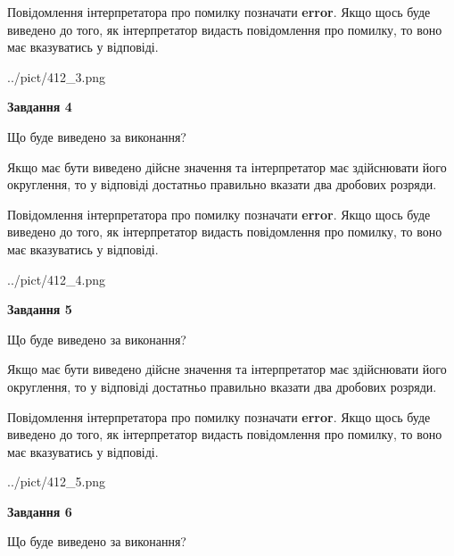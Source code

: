\documentclass[12pt, ukrainian]{article}
\begin{document}
{\begin {Large}
Повідомлення інтерпретатора про помилку позначати \textbf{error}.
Якщо щось буде виведено до того, як інтерпретатор видасть повідомлення про помилку, 
то воно має вказуватись у відповіді. \par

\begin{center}
	{../pict/412_3.png}
\end{center}
\newpage

{\begin {center}\textbf{Завдання 4}\end {center}}\par
Що буде виведено за виконання? \par

Якщо має бути виведено дійсне значення та інтерпретатор має здійснювати його округлення, 
то у відповіді достатньо правильно вказати два дробових розряди.

Повідомлення інтерпретатора про помилку позначати \textbf{error}.
Якщо щось буде виведено до того, як інтерпретатор видасть повідомлення про помилку, 
то воно має вказуватись у відповіді. \par

\begin{center}
	{../pict/412_4.png}
\end{center}
\newpage

{\begin {center}\textbf{Завдання 5}\end {center}}\par
Що буде виведено за виконання? \par

Якщо має бути виведено дійсне значення та інтерпретатор має здійснювати його округлення, 
то у відповіді достатньо правильно вказати два дробових розряди.

Повідомлення інтерпретатора про помилку позначати \textbf{error}.
Якщо щось буде виведено до того, як інтерпретатор видасть повідомлення про помилку, 
то воно має вказуватись у відповіді. \par

\begin{center}
	{../pict/412_5.png}
\end{center}
\newpage

{\begin {center}\textbf{Завдання 6}\end {center}}\par
Що буде виведено за виконання? \par


\end{Large}}
\end{document}

